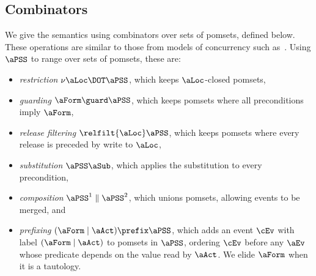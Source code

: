 \subsection{Combinators}
\label{sec:combinators}
We give the semantics using combinators over sets of pomsets, defined below.
These operations are similar to those from models of concurrency such
as~\cite{Brookes:1984:TCS:828.833}.
Using $\aPSS$ to range over sets of pomsets, these are:
\begin{itemize}
\item \emph{restriction} $\nu\aLoc\DOT\aPSS$, which keeps 
  $\aLoc$-closed pomsets,
\item \emph{guarding} $\aForm\guard\aPSS$, which
  keeps pomsets where all preconditions imply $\aForm$, 
\item \emph{release filtering} $\relfilt{\aLoc}\aPSS$, which keeps pomsets where
  every release is preceded by \anexternal write to $\aLoc$,
\item \emph{substitution} $\aPSS\aSub$, which applies the substitution to
  every precondition,
\item \emph{composition} $\aPSS^1\parallel\aPSS^2$, which unions pomsets, allowing events to be merged, and
\item \emph{prefixing} $(\aForm \mid \aAct)\prefix\aPSS$, which adds an event $\cEv$ with label
  $(\aForm \mid \aAct)$ to pomsets in $\aPSS$, ordering $\cEv$ before any $\aEv$ whose predicate
  depends on the value read by $\aAct$. We elide $\aForm$ when it is a tautology.
\end{itemize}

